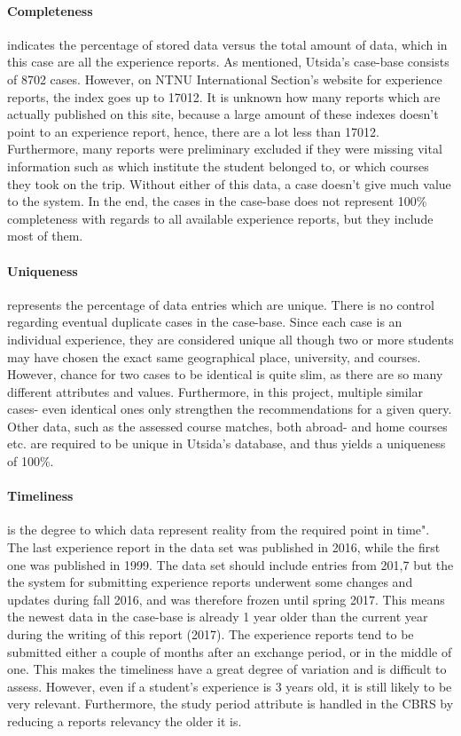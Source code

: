 \paragraph{Completeness} indicates the percentage of stored data versus the total amount of data, which in this case are all the experience reports. As mentioned, Utsida's case-base consists of 8702 cases. However, on NTNU International Section's website for experience reports, the index goes up to 17012. It is unknown how many reports which are actually published on this site, because a large amount of these indexes doesn't point to an experience report, hence, there are a lot less than 17012. Furthermore, many reports were preliminary excluded if they were missing vital information such as which institute the student belonged to, or which courses they took on the trip. Without either of this data, a case doesn't give much value to the system. In the end, the cases in the case-base does not represent 100\% completeness with regards to all available experience reports, but they include most of them.

\paragraph{Uniqueness} represents the percentage of data entries which are unique. There is no control regarding eventual duplicate cases in the case-base. Since each case is an individual experience, they are considered unique all though two or more students may have chosen the exact same geographical place, university, and courses. However, chance for two cases to be identical is quite slim, as there are so many different attributes and values. Furthermore, in this project, multiple similar cases- even identical ones only strengthen the recommendations for a given query. Other data, such as the assessed course matches, both abroad- and home courses etc. are required to be unique in Utsida's database, and thus yields a uniqueness of 100\%.

\paragraph{Timeliness} 
is the degree to which data represent reality from the required point in time"\cite{askham2013six}. The last experience report in the data set was published in 2016, while the first one was published in 1999. The data set should include entries from 201,7 but the the system for submitting experience reports underwent some changes and updates during fall 2016, and was therefore frozen until spring 2017. This means the newest data in the case-base is already 1 year older than the current year during the writing of this report (2017). The experience reports tend to be submitted either a couple of months after an exchange period, or in the middle of one. This makes the timeliness have a great degree of variation and is difficult to assess. However, even if a student's experience is 3 years old, it is still likely to be very relevant. Furthermore, the study period attribute is handled in the CBRS by reducing a reports relevancy the older it is.

